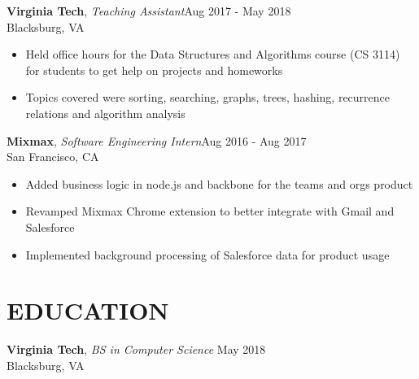 \documentclass[line,margin]{res}
\begin{document}
\begin{resume}
		\textbf{Virginia Tech}, {\sl Teaching Assistant}\hfill Aug 2017 - May 2018\\Blacksburg, VA\\
		\begin{itemize} \itemsep 1pt
		\item Held office hours for the Data Structures and Algorithms course (CS 3114) for students
			  to get help on projects and homeworks
		\item Topics covered were sorting, searching, graphs, trees, hashing, recurrence relations and algorithm analysis
		\end{itemize}

		\textbf{Mixmax}, {\sl Software Engineering Intern}\hfill Aug 2016 - Aug 2017\\San Francisco, CA\\
		\begin{itemize} \itemsep 1pt
			\item Added business logic in node.js and backbone for the teams and orgs product
			\item Revamped Mixmax Chrome extension to better integrate with Gmail and Salesforce
			\item Implemented background processing of Salesforce data for product usage
		\end{itemize}

	\section{EDUCATION}
		\textbf{Virginia Tech}, {\sl BS in Computer Science} \hfill May 2018\\Blacksburg, VA

\end{resume}
\end{document}
